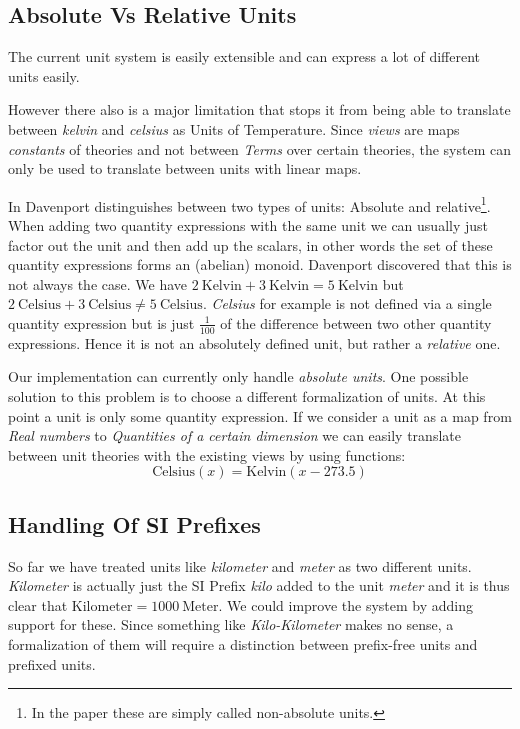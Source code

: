 \subsection{Absolute Vs Relative Units}
The current unit system is easily extensible and can express a lot of different units easily.

However there also is a major limitation that stops it from being able to translate between \textit{kelvin} and \textit{celsius} as Units of Temperature. Since \textit{views} are maps \textit{constants} of theories and not between \textit{Terms} over certain theories, the system can only be used to translate between units with linear maps.

In \cite{SD:UnitKnowledgeMgmt08} Davenport distinguishes between two types of units: Absolute and relative\footnote{In the paper these are simply called non-absolute units. }. When adding two quantity expressions with the same unit we can usually just factor out the unit and then add up the scalars, in other words the set of these quantity expressions forms an (abelian) monoid. Davenport discovered that this is not always the case. We have $2\ \text{Kelvin} + 3\ \text{Kelvin} = 5\ \text{Kelvin}$ but $2\ \text{Celsius} + 3\ \text{Celsius} \neq 5\ \text{Celsius}$. \textit{Celsius} for example is not defined via a single quantity expression but is just $\frac{1}{100}$ of the difference between two other quantity expressions. Hence it is not an absolutely defined unit, but rather a \textit{relative} one.

Our implementation can currently only handle \textit{absolute units}. One possible solution to this problem is to choose a different formalization of units. At this point a unit is only some quantity expression. If we consider a unit as a map from \textit{Real numbers} to \textit{Quantities of a certain dimension} we can easily translate between unit theories with the existing views by using functions:
\[\text{Celsius}(x) = \text{Kelvin}(x - 273.5)\]


\subsection{Handling Of SI Prefixes}
So far we have treated units like \textit{kilometer} and \textit{meter} as two different units. \textit{Kilometer} is actually just the SI Prefix \textit{kilo} added to the unit \textit{meter} and it is thus clear that $\text{Kilometer} = 1000\ \text{Meter}$. We could improve the system by adding support for these. Since something like \textit{Kilo-Kilometer} makes no sense, a formalization of them will require a distinction between prefix-free units and prefixed units.

